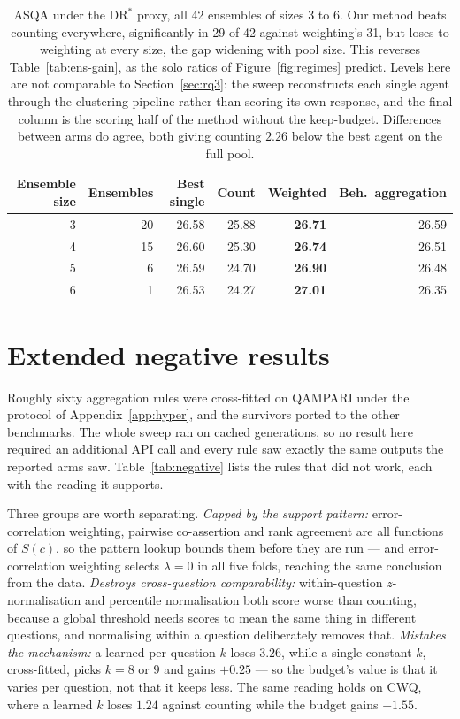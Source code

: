 \documentclass[11pt]{article}
\begin{document}
\begin{table}[t]
  \caption{ASQA under the $\mathrm{DR}^*$ proxy, all 42 ensembles of sizes 3 to 6. Our method beats counting everywhere, significantly in 29 of 42 against weighting's 31, but loses to weighting at every size, the gap widening with pool size. This reverses Table~\ref{tab:ens-gain}, as the solo ratios of Figure~\ref{fig:regimes} predict. Levels here are not comparable to Section~\ref{sec:rq3}: the sweep reconstructs each single agent through the clustering pipeline rather than scoring its own response, and the final column is the scoring half of the method without the keep-budget. Differences between arms do agree, both giving counting $2.26$ below the best agent on the full pool.}
  \label{tab:asqa}
  \centering
  \begin{tabular}{rrrrrr}
    \toprule
    Ensemble size & Ensembles & Best single & Count & Weighted & Beh.\ aggregation \\
    \midrule
    3 & 20 & 26.58 & 25.88 & \textbf{26.71} & 26.59 \\
    4 & 15 & 26.60 & 25.30 & \textbf{26.74} & 26.51 \\
    5 &  6 & 26.59 & 24.70 & \textbf{26.90} & 26.48 \\
    6 &  1 & 26.53 & 24.27 & \textbf{27.01} & 26.35 \\
    \bottomrule
  \end{tabular}
\end{table}

\section{Extended negative results}
\label{app:negative}

Roughly sixty aggregation rules were cross-fitted on QAMPARI under the protocol of Appendix~\ref{app:hyper}, and the survivors ported to the other benchmarks. The whole sweep ran on cached generations, so no result here required an additional API call and every rule saw exactly the same outputs the reported arms saw. Table~\ref{tab:negative} lists the rules that did not work, each with the reading it supports.

Three groups are worth separating. \emph{Capped by the support pattern:} error-correlation weighting, pairwise co-assertion and rank agreement are all functions of $S(c)$, so the pattern lookup bounds them before they are run --- and error-correlation weighting selects $\lambda = 0$ in all five folds, reaching the same conclusion from the data. \emph{Destroys cross-question comparability:} within-question $z$-normalisation and percentile normalisation both score worse than counting, because a global threshold needs scores to mean the same thing in different questions, and normalising within a question deliberately removes that. \emph{Mistakes the mechanism:} a learned per-question $k$ loses $3.26$, while a single constant $k$, cross-fitted, picks $k=8$ or $9$ and gains $+0.25$ --- so the budget's value is that it varies per question, not that it keeps less. The same reading holds on CWQ, where a learned $k$ loses $1.24$ against counting while the budget gains $+1.55$.
\end{document}
